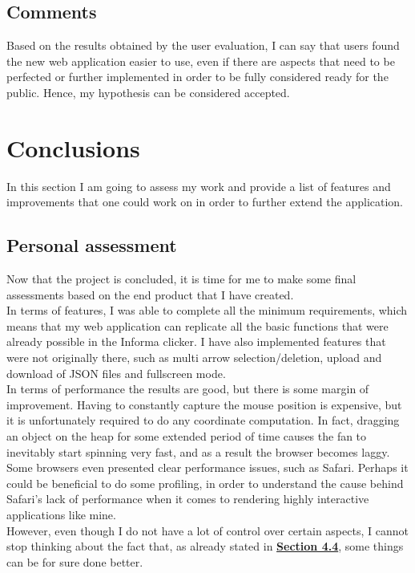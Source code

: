 \documentclass[]{usiinfbachelorproject}
\begin{document}
\subsection{Comments}

Based on the results obtained by the user evaluation, I can say that users found the new web application easier to use, even if there are aspects that need to be perfected or further implemented in order to be fully considered ready for the public. Hence, my hypothesis can be considered accepted.

\vspace{\fill}
\pagebreak

\section{Conclusions} \label{Conclusions}

In this section I am going to assess my work and provide a list of features and improvements that one could work on in order to further extend the application.

\subsection{Personal assessment}

Now that the project is concluded, it is time for me to make some final assessments based on the end product that I have created. \\
In terms of features, I was able to complete all the minimum requirements, which means that my web application can replicate all the basic functions that were already possible in the Informa clicker. I have also implemented features that were not originally there, such as multi arrow selection/deletion, upload and download of JSON files and fullscreen mode.\\
In terms of performance the results are good, but there is some margin of improvement. Having to constantly capture the mouse position is expensive, but it is unfortunately required to do any coordinate computation. In fact, dragging an object on the heap for some extended period of time causes the fan to inevitably start spinning very fast, and as a result the browser becomes laggy. Some browsers even presented clear performance issues, such as Safari. Perhaps it could be beneficial to do some profiling, in order to understand the cause behind Safari's lack of performance when it comes to rendering highly interactive applications like mine. \\
However, even though I do not have a lot of control over certain aspects, I cannot stop thinking about the fact that, as already stated in \hyperref[storing states]{\textbf{Section 4.4}}, some things can be for sure done better.
\end{document}
